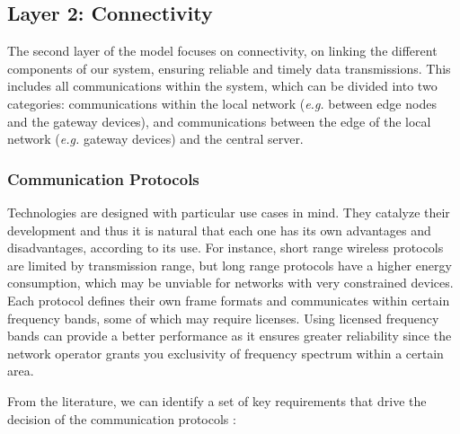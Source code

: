 \subsection{Layer 2: Connectivity}
\label{sec:iot-model-layer2}

The second layer of the model focuses on connectivity, on linking the different components of our system, ensuring reliable and timely data transmissions. This includes all communications within the system, which can be divided into two categories: communications within the local network (\textit{e.g.} between edge nodes and the gateway devices), and communications between the edge of the local network (\textit{e.g.} gateway devices) and the central server. \bigskip

\subsubsection{Communication Protocols}

Technologies are designed with particular use cases in mind. They catalyze their development and thus it is natural that each one has its own advantages and disadvantages, according to its use. For instance, short range wireless protocols are limited by transmission range, but long range protocols have a higher energy consumption, which may be unviable for networks with very constrained devices. Each protocol defines their own frame formats and communicates within certain frequency bands, some of which may require licenses. Using licensed frequency bands can provide a better performance as it ensures greater reliability since the network operator grants you exclusivity of frequency spectrum within a certain area. \bigskip

From the literature, we can identify a set of key requirements that drive the decision of the communication protocols \cite{Baker2017, Catarinucci2015, Adame2018}:

